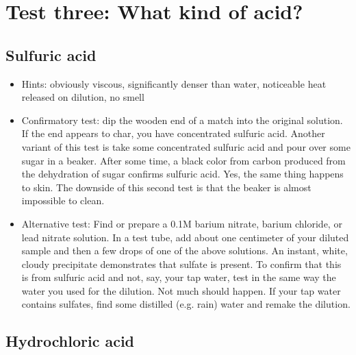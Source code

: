 \section{Test three: What kind of acid?}

\subsection{Sulfuric acid}

\begin{itemize}

\item{Hints: obviously viscous, 
significantly denser than water, 
noticeable heat released on dilution, 
no smell}

\item{Confirmatory test: dip the wooden end of a match into the original solution. 
If the end appears to char, 
you have concentrated sulfuric acid. 
Another variant of this test is take some concentrated sulfuric acid 
and pour over some sugar in a beaker. 
After some time, 
a black color from carbon produced 
from the dehydration of sugar confirms sulfuric acid. 
Yes, 
the same thing happens to skin. 
The downside of this second test is that the beaker 
is almost impossible to clean.}

\item{Alternative test: Find or prepare a 0.1M barium nitrate, 
barium chloride, 
or lead nitrate solution. 
In a test tube, 
add about one centimeter of your diluted sample 
and then a few drops of one of the above solutions. 
An instant, 
white, 
cloudy precipitate demonstrates that sulfate is present. 
To confirm that this is from sulfuric acid and not, 
say, 
your tap water, 
test in the same way the water you used for the dilution. 
Not much should happen. 
If your tap water contains sulfates, 
find some distilled (e.g. 
rain) water and remake the dilution.}
\end{itemize}

\subsection{Hydrochloric acid}

